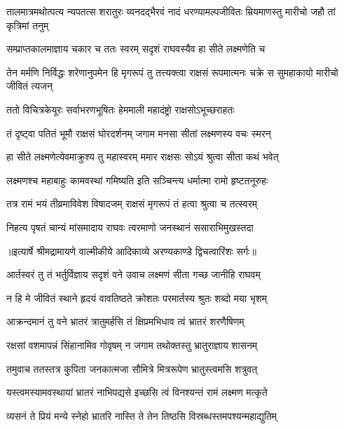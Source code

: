 \threelineshloka
{तालमात्रमथोत्पत्य न्यपतत्स शरातुरः}
{व्यनदद्भैरवं नादं धरण्यामल्पजीवितः}
{म्रियमाणस्तु मारीचो जहौ तां कृत्रिमां तनुम्} %

\twolineshloka
{सम्प्राप्तकालमाज्ञाय चकार च ततः स्वरम्}
{सदृशं राघवस्यैव हा सीते लक्ष्मणेति च} %

\threelineshloka
{तेन मर्मणि निर्विद्धः शरेणानुपमेन हि}
{मृगरूपं तु तत्त्यक्त्वा राक्षसं रूपमात्मनः}
{चक्रे स सुमहाकायो मारीचो जीवितं त्यजन्} %

\twolineshloka
{ततो विचित्रकेयूरः सर्वाभरणभूषितः}
{हेममाली महादंष्ट्रो राक्षसोऽभूच्छराहतः} %

\twolineshloka
{तं दृष्ट्वा पतितं भूमौ राक्षसं घोरदर्शनम्}
{जगाम मनसा सीतां लक्ष्मणस्य वचः स्मरन्} %

\twolineshloka
{हा सीते लक्ष्मणेत्येवमाक्रुश्य तु महास्वरम्}
{ममार राक्षसः सोऽयं श्रुत्वा सीता कथं भवेत्} %

\twolineshloka
{लक्ष्मणश्च महाबाहुः कामवस्थां गमिष्यति}
{इति सञ्चिन्त्य धर्मात्मा रामो हृष्टतनूरुहः} %

\twolineshloka
{तत्र रामं भयं तीव्रमाविवेश विषादजम्}
{राक्षसं मृगरूपं तं हत्वा श्रुत्वा च तत्स्वरम्} %

\twolineshloka
{निहत्य पृषतं चान्यं मांसमादाय राघवः}
{त्वरमाणो जनस्थानं ससाराभिमुखस्तदा} %


{॥इत्यार्षे श्रीमद्रामायणे वाल्मीकीये आदिकाव्ये अरण्यकाण्डे द्विचत्वारिंशः सर्गः॥}


\twolineshloka
{आर्तस्वरं तु तं भर्तुर्विज्ञाय सदृशं वने}
{उवाच लक्ष्मणं सीता गच्छ जानीहि राघवम्} %

\twolineshloka
{न हि मे जीवितं स्थाने हृदयं वावतिष्ठते}
{क्रोशतः परमार्तस्य श्रुतः शब्दो मया भृशम्} %

\twolineshloka
{आक्रन्दमानं तु वने भ्रातरं त्रातुमर्हसि}
{तं क्षिप्रमभिधाव त्वं भ्रातरं शरणैषिणम्} %

\twolineshloka
{रक्षसां वशमापन्नं सिंहानामिव गोवृषम्}
{न जगाम तथोक्तस्तु भ्रातुराज्ञाय शासनम्} %

\twolineshloka
{तमुवाच ततस्तत्र कुपिता जनकात्मजा}
{सौमित्रे मित्ररूपेण भ्रातुस्त्वमसि शत्रुवत्} %

\twolineshloka
{यस्त्वमस्यामवस्थायां भ्रातरं नाभिपद्यसे}
{इच्छसि त्वं विनश्यन्तं रामं लक्ष्मण मत्कृते} %

\twolineshloka
{व्यसनं ते प्रियं मन्ये स्नेहो भ्रातरि नास्ति ते}
{तेन तिष्ठसि विस्रब्धस्तमपश्यन्महाद्युतिम्} %

